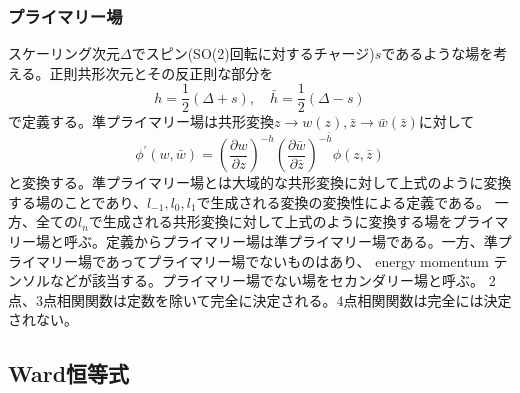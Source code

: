 \documentclass[11pt, aps, longbibliography]{article}
\numberwithin{equation}{section}
\begin{document}
        \subsubsection{プライマリー場}
        スケーリング次元$\Delta$でスピン(SO(2)回転に対するチャージ)$s$であるような場を考える。正則共形次元とその反正則な部分を
        \begin{equation}
            h = \frac{1}{2}(\Delta + s), \quad \bar{h} = \frac{1}{2}(\Delta -s )
        \end{equation}
        で定義する。準プライマリー場は共形変換$z\rightarrow w(z), \bar{z}\rightarrow \bar{w}(\bar{z})$に対して
        \begin{equation}
            \phi^{\prime}(w, \bar{w}) = \left(\frac{\partial w}{\partial z}\right)^{-h} \left(\frac{\partial \bar{w}}{\partial \bar{z}}\right)^{-\bar{h}} \phi(z, \bar{z})
        \end{equation}
        と変換する。準プライマリー場とは大域的な共形変換に対して上式のように変換する場のことであり、$l_{-1}, l_0, l_1$で生成される変換の変換性による定義である。
        一方、全ての$l_n$で生成される共形変換に対して上式のように変換する場をプライマリー場と呼ぶ。定義からプライマリー場は準プライマリー場である。一方、準プライマリー場であってプライマリー場でないものはあり、
        energy momentum テンソルなどが該当する。プライマリー場でない場をセカンダリー場と呼ぶ。
        2点、3点相関関数は定数を除いて完全に決定される。4点相関関数は完全には決定されない。

    \subsection{Ward恒等式}
\end{document}
